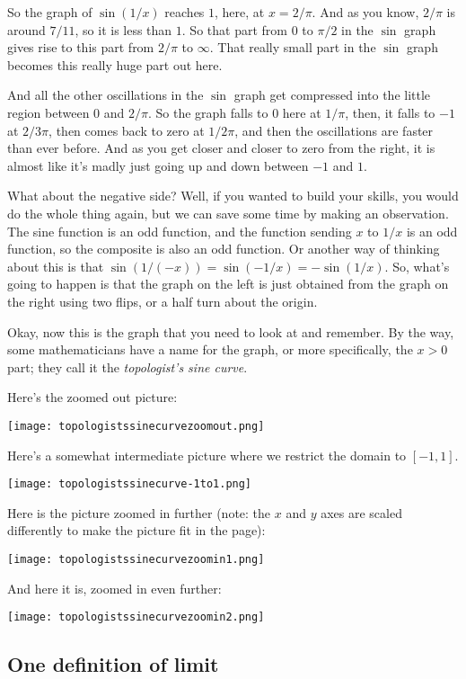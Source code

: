 \documentclass[10pt]{amsart}
\begin{document}
So the graph of $\sin(1/x)$ reaches $1$, here, at $x = 2/\pi$. And as
you know, $2/\pi$ is around $7/11$, so it is less than $1$. So that
part from $0$ to $\pi/2$ in the $\sin$ graph gives rise to this part
from $2/\pi$ to $\infty$. That really small part in the $\sin$ graph
becomes this really huge part out here.


And all the other oscillations in the $\sin$ graph get compressed into
the little region between $0$ and $2/\pi$. So the graph falls to $0$
here at $1/\pi$, then, it falls to $-1$ at $2/3\pi$, then comes back
to zero at $1/2\pi$, and then the oscillations are faster than ever
before. And as you get closer and closer to zero from the right, it is
almost like it's madly just going up and down between $-1$ and
$1$.

What about the negative side? Well, if you wanted to build your
skills, you would do the whole thing again, but we can save some time
by making an observation. The sine function is an odd function, and
the function sending $x$ to $1/x$ is an odd function, so the composite
is also an odd function. Or another way of thinking about this is that
$\sin(1/(-x)) = \sin(-1/x) = -\sin(1/x)$. So, what's going to happen
is that the graph on the left is just obtained from the graph on the
right using two flips, or a half turn about the origin.

Okay, now this is the graph that you need to look at and remember. By
the way, some mathematicians have a name for the graph, or more
specifically, the $x > 0$ part; they call it the {\em topologist's
sine curve}.

Here's the zoomed out picture:

\texttt{[image: topologistssinecurvezoomout.png]}

Here's a somewhat intermediate picture where we restrict the domain to
$[-1,1]$.

\texttt{[image: topologistssinecurve-1to1.png]}

Here is the picture zoomed in further (note: the $x$ and $y$ axes are
scaled differently to make the picture fit in the page):

\texttt{[image: topologistssinecurvezoomin1.png]}

And here it is, zoomed in even further:

\texttt{[image: topologistssinecurvezoomin2.png]}
\subsection{One definition of limit}
\end{document}
